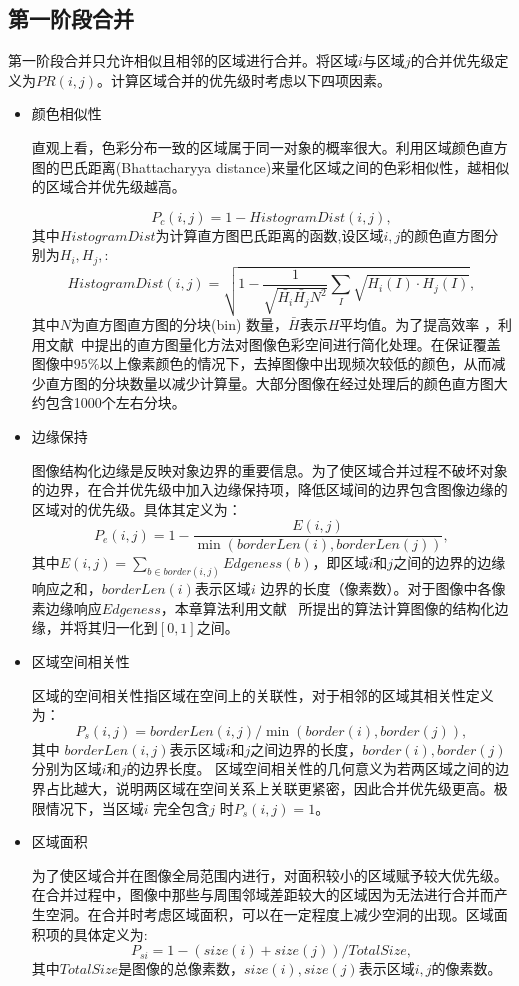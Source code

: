\subsection{第一阶段合并}
\label{subsec:mergeP1}
第一阶段合并只允许相似且相邻的区域进行合并。将区域$i$与区域$j$的合并优先级定义为$PR(i,j)$。计算区域合并的优先级时考虑以下四项因素。
\begin{itemize}
\item 颜色相似性\par
    直观上看，色彩分布一致的区域属于同一对象的概率很大。利用区域颜色直方图的巴氏距离(Bhattacharyya distance)来量化区域之间的色彩相似性，越相似的区域合并优先级越高。

    \begin{equation}
    \label{equ:chap2:Pc}
    P_{c}(i,j)=1-HistogramDist(i,j),
    \end{equation}
    其中$HistogramDist$为计算直方图巴氏距离的函数,设区域$i,j$的颜色直方图分别为$H_i,H_j,$:
    $$HistogramDist(i,j) = \sqrt{1-\frac{1}{\sqrt{\bar{H_i}\bar{H_j}N^2}}\sum_{I}\sqrt{H_i(I)\cdot H_j(I)}},$$
    其中$N$为直方图直方图的分块(bin) 数量，$\bar{H}$表示$H$平均值。为了提高效率 ，利用文献~中提出的直方图量化方法对图像色彩空间进行简化处理。在保证覆盖图像中$95\%$以上像素颜色的情况下，去掉图像中出现频次较低的颜色，从而减少直方图的分块数量以减少计算量。大部分图像在经过处理后的颜色直方图大约包含1000个左右分块。
\item 边缘保持\par
    图像结构化边缘是反映对象边界的重要信息。为了使区域合并过程不破坏对象的边界，在合并优先级中加入边缘保持项，降低区域间的边界包含图像边缘的区域对的优先级。具体其定义为：
    $$P_{e}(i,j)=1-\frac{E(i,j)}{\min(borderLen(i),borderLen(j))},$$
    其中$E(i,j)=\sum_{b\in border(i,j)}Edgeness(b)$，即区域$i$和$j$之间的边界的边缘响应之和，$borderLen(i)$表示区域$i$ 边界的长度（像素数）。对于图像中各像素边缘响应$Edgeness$，本章算法利用文献~ 所提出的算法计算图像的结构化边缘，并将其归一化到$[0,1]$之间。
\item 区域空间相关性\par
    区域的空间相关性指区域在空间上的关联性，对于相邻的区域其相关性定义为：
    $$P_{s}(i,j)=borderLen(i,j)/\min⁡(border(i),border(j)),$$ 其中 $borderLen(i,j)$表示区域$i$和$j$之间边界的长度，$border(i),border(j)$ 分别为区域$i$和$j$的边界长度。 区域空间相关性的几何意义为若两区域之间的边界占比越大，说明两区域在空间关系上关联更紧密，因此合并优先级更高。极限情况下，当区域$i$ 完全包含$j$ 时$P_{s} (i,j)=1$。
\item 区域面积\par
    为了使区域合并在图像全局范围内进行，对面积较小的区域赋予较大优先级。在合并过程中，图像中那些与周围邻域差距较大的区域因为无法进行合并而产生空洞。在合并时考虑区域面积，可以在一定程度上减少空洞的出现。区域面积项的具体定义为:
    $$P_{si}=1-(size(i)+size(j))/TotalSize,$$其中$TotalSize$是图像的总像素数，$size(i),size(j)$表示区域$i,j$的像素数。
\end{itemize}\par
